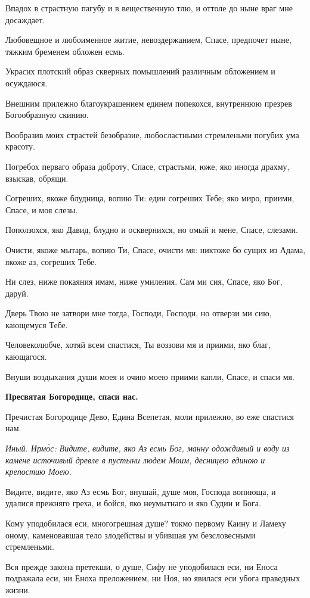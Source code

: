 Впадох в страстную пагубу и в вещественную тлю, и оттоле до ныне враг мне досаждает.

Любовещное и любоименное житие, невоздержанием, Спасе, предпочет ныне, тяжким бременем обложен есмь.

Украсих плотский образ скверных помышлений различным обложением и осуждаюся.

Внешним прилежно благоукрашением единем попекохся, внутреннюю презрев Богообразную скинию.

Вообразив моих страстей безобразие, любосластными стремленьми погубих ума красоту.

Погребох перваго образа доброту, Спасе, страстьми, юже, яко иногда драхму, взыскав, обрящи.

Согреших, якоже блудница, вопию Ти: един согреших Тебе; яко миро, приими, Спасе, и моя слезы.

Поползохся, яко Давид, блудно и осквернихся, но омый и мене, Спасе, слезами.

Очисти, якоже мытарь, вопию Ти, Спасе, очисти мя: никтоже бо сущих из Адама, якоже аз, согреших Тебе.

Ни слез, ниже покаяния имам, ниже умиления. Сам ми сия, Спасе, яко Бог, даруй.

Дверь Твою не затвори мне тогда, Господи, Господи, но отверзи ми сию, кающемуся Тебе.

Человеколюбче, хотяй всем спастися, Ты воззови мя и приими, яко благ, кающагося.

Внуши воздыхания души моея и очию моею приими капли, Спасе, и спаси мя.

\bfseries Пресвятая Богородице, спаси нас.

\normalfont{}

Пречистая Богородице Дево, Едина Всепетая, моли прилежно, во еже спастися нам.

\itshape Иный. Ирм\'{о}с\normalfont{}: Видите, видите, яко Аз есмь Бог, манну одождивый и воду из камене источивый древле в пустыни людем Моим, десницею единою и крепостию Моею.

Видите, видите, яко Аз есмь Бог, внушай, душе моя, Господа вопиюща, и удалися прежняго греха, и бойся, яко неумытнаго и яко Судии и Бога.

Кому уподобилася еси, многогрешная душе? токмо первому Каину и Ламеху оному, каменовавшая тело злодействы и убившая ум безсловесными стремленьми.

Вся прежде закона претекши, о душе, Сифу не уподобилася еси, ни Еноса подражала еси, ни Еноха преложением, ни Ноя, но явилася еси убога праведных жизни.

